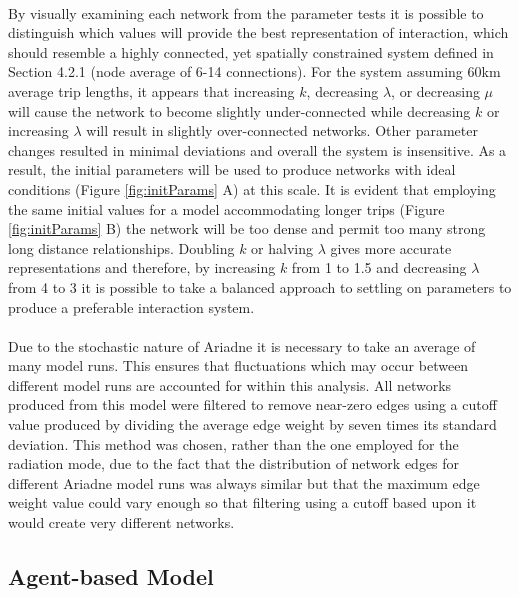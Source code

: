\documentclass[12pt,a4paper]{thesis}
\begin{document}
\paragraph{}
By visually examining each network from the parameter tests it is possible to distinguish which values will provide the best representation of interaction, which should resemble a highly connected, yet spatially constrained system defined in Section 4.2.1 (node average of 6-14 connections). For the system assuming 60km average trip lengths, it appears that increasing $k$, decreasing $\lambda$, or decreasing $\mu$ will cause the network to become slightly under-connected while decreasing $k$ or increasing $\lambda$ will result in slightly over-connected networks. Other parameter changes resulted in minimal deviations and overall the system is insensitive. As a result, the initial parameters will be used to produce networks with ideal conditions (Figure \ref{fig:initParams} A) at this scale. It is evident that employing the same initial values for a model accommodating longer trips (Figure \ref{fig:initParams} B) the network will be too dense and permit too many strong long distance relationships. Doubling $k$ or halving $\lambda$ gives more accurate representations and therefore, by increasing $k$ from 1 to 1.5 and decreasing $\lambda$ from 4 to 3 it is possible to take a balanced approach to settling on parameters to produce a preferable interaction system.

\paragraph{}
Due to the stochastic nature of Ariadne it is necessary to take an average of many model runs. This ensures that fluctuations which may occur between different model runs are accounted for within this analysis. 
All networks produced from this model were filtered to remove near-zero edges using a cutoff value produced by dividing the average edge weight by seven times its standard deviation. This method was chosen, rather than the one employed for the radiation mode, due to the fact that the distribution of network edges for different Ariadne model runs was always similar but that the maximum edge weight value could vary enough so that filtering using a cutoff based upon it would create very different networks.  


\subsection{Agent-based Model}
\end{document}
